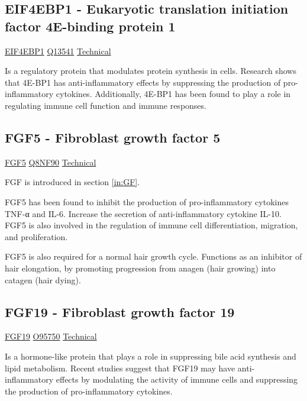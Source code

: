 \subsection{EIF4EBP1 - Eukaryotic translation initiation factor 4E-binding protein 1}

\href{https://en.wikipedia.org/wiki/EIF4EBP1}{EIF4EBP1}
\href{http://www.uniprot.org/uniprot/Q13541}{Q13541}
\href{https://olink.com/products-services/target/protein/?assayID=5092}{Technical}

Is a regulatory protein that modulates protein synthesis in cells. Research shows that 4E-BP1 has anti-inflammatory effects by suppressing the production of pro-inflammatory cytokines. Additionally, 4E-BP1 has been found to play a role in regulating immune cell function and immune responses.


\subsection{FGF5 - Fibroblast growth factor 5}

\href{https://en.wikipedia.org/wiki/FGF5}{FGF5}
\href{http://www.uniprot.org/uniprot/Q8NF90}{Q8NF90}
\href{https://olink.com/products-services/target/protein/?assayID=5049}{Technical}

FGF is introduced in section \ref{in:GF}.

FGF5 has been found to inhibit the production of pro-inflammatory cytokines TNF-α and IL-6. Increase the secretion of anti-inflammatory cytokine IL-10. FGF5 is also involved in the regulation of immune cell differentiation, migration, and proliferation.

FGF5 is also required for a normal hair growth cycle. Functions as an inhibitor of hair elongation, by promoting progression from anagen (hair growing) into catagen (hair dying).

\subsection{FGF19 - Fibroblast growth factor 19}

\href{https://en.wikipedia.org/wiki/FGF19}{FGF19}
\href{http://www.uniprot.org/uniprot/O95750}{O95750}
\href{https://olink.com/products-services/target/protein/?assayID=5127}{Technical}

Is a hormone-like protein that plays a role in suppressing bile acid synthesis and lipid metabolism. Recent studies suggest that FGF19 may have anti-inflammatory effects by modulating the activity of immune cells and suppressing the production of pro-inflammatory cytokines.

